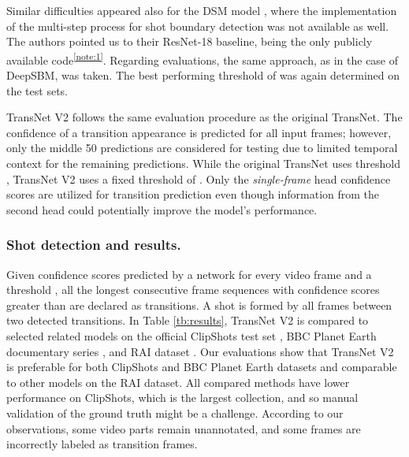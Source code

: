 \documentclass[sigconf]{acmart}
\begin{document}
Similar difficulties appeared also for the DSM model \cite{Tang2018clipshots}, where the implementation of the multi-step process for shot boundary detection was not available as well. The authors pointed us to their ResNet-18 baseline, being the only publicly available code\textsuperscript{\ref{note:1}}. Regarding evaluations, the same approach, as in the case of DeepSBM, was taken. The best performing threshold of  was again determined on the test sets.

TransNet V2 follows the same evaluation procedure as the original TransNet. The confidence of a transition appearance is predicted for all  input frames; however, only the middle 50 predictions are considered for testing due to limited temporal context for the remaining predictions. While the original TransNet uses threshold , TransNet V2 uses a fixed threshold of . Only the \textit{single-frame} head confidence scores are utilized for transition prediction even though information from the second head could potentially improve the model's performance.

\subsubsection{Shot detection and results.}
Given confidence scores predicted by a network for every video frame and a threshold , all the longest consecutive frame sequences with confidence scores greater than  are declared as transitions. A shot is formed by all frames between two detected transitions.
In Table \ref{tb:results}, TransNet V2 is compared to selected related models on the official ClipShots test set \cite{Tang2018clipshots}, BBC Planet Earth documentary series \cite{Baraldi2015SceneSiamDet_BBC}, and RAI dataset \cite{Baraldi15RAI}. Our evaluations show that TransNet V2 is preferable for both ClipShots and BBC Planet Earth datasets and comparable to other models on the RAI dataset. All compared methods have lower performance on ClipShots, which is the largest collection, and so manual validation of the ground truth might be a challenge. According to our observations, some video parts remain unannotated, and some frames are incorrectly labeled as transition frames.
\end{document}
